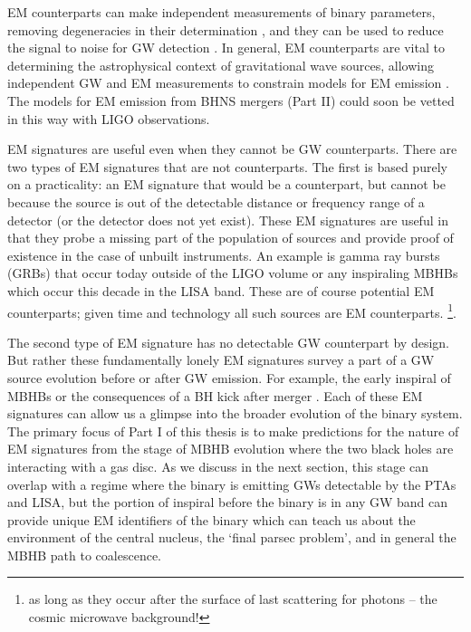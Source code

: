 EM counterparts can make independent measurements of binary parameters, removing
degeneracies in their determination \citep{HughesHolz:2003}, and they can be
used to reduce the signal to noise for GW detection \citep{KochanekPiran:1993,
HarryFairhurst:2011}. In general, EM counterparts are vital to determining the
astrophysical context of gravitational wave sources, allowing independent GW
and EM measurements to constrain models for EM emission \citep{Phinney:2009,
MandelO'Sh:2010}. The models for EM emission from BHNS mergers (Part II) could
soon be vetted in this way with LIGO observations.

EM signatures are useful even when they cannot be GW counterparts. There are
two types of EM signatures that are not counterparts. The first is based
purely on a practicality: an EM signature that would be a counterpart, but
cannot be because the source is out of the detectable distance or frequency
range of a detector (or the detector does not yet
exist). These EM signatures are useful in that they probe a missing part of
the population of sources and provide proof of existence in the case of
unbuilt instruments.
An example is gamma ray bursts (GRBs) that occur today outside of the LIGO volume
or any inspiraling MBHBs which occur this decade in the LISA band. These are
of course potential EM counterparts; given time and technology all such
sources are EM counterparts. \footnote{as long as they occur after the surface
of last scattering for photons -- the cosmic microwave background!}.

The second type of EM signature has no detectable GW counterpart by design.
But rather these fundamentally lonely EM signatures survey a part of a GW
source evolution before or after GW emission. For example, the early inspiral
of MBHBs \citep[\textit{e.g.}][]{Haiman+2008, HKM09} or the consequences of a BH
kick after merger \citep[\textit{e.g.}][]{Lippai:2008}. %
%
Each of these EM
signatures can allow us a glimpse into the broader evolution of the binary
system. The primary focus of Part I of this thesis is to make predictions for
the nature of EM signatures from the stage of MBHB evolution where the two
black holes are interacting with a gas disc. As we discuss in the next
section, this stage can overlap with a regime where the binary is emitting GWs
detectable by the PTAs and LISA, but the portion of inspiral before the binary
is in any GW band can provide unique EM identifiers of the binary which can
teach us about the environment of the central nucleus, the `final parsec
problem', and in general the MBHB path to coalescence.

